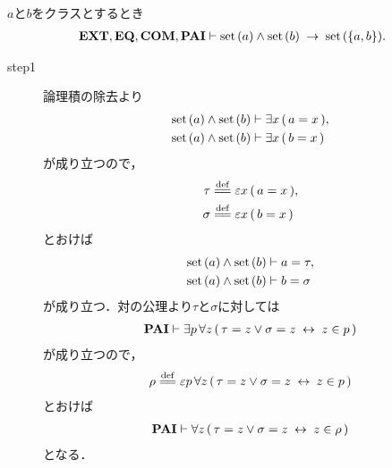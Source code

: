 	\begin{screen}
		\begin{thm}[集合の対は集合である]
		\label{thm:pair_of_sets_is_a_set}
			$a$と$b$をクラスとするとき
			\begin{align}
				\mbox{{\bf EXT}},\mbox{{\bf EQ}},\mbox{\bf COM},\mbox{{\bf PAI}} \vdash 
				\operatorname*{set}\hspace{0.15em}(a) \wedge \operatorname*{set}\hspace{0.15em}(b) \hspace{0.25em}\rightarrow\hspace{0.25em} \operatorname*{set}\hspace{0.15em}(\{a,b\}).
			\end{align}
		\end{thm}
	\end{screen}
	
	\begin{sketch}\mbox{}
		\begin{description}
			\item[step1]
				論理積の除去より
				\begin{align}
					\operatorname*{set}\hspace{0.15em}(a) \wedge \operatorname*{set}\hspace{0.15em}(b) &\vdash \exists x\, (\, a = x\, ), \\
					\operatorname*{set}\hspace{0.15em}(a) \wedge \operatorname*{set}\hspace{0.15em}(b) &\vdash \exists x\, (\, b = x\, )
				\end{align}
				が成り立つので，
				\begin{align}
					\tau &\defeq \varepsilon x\, (\, a = x\, ), \\
					\sigma &\defeq \varepsilon x\, (\, b = x\, )
				\end{align}
				とおけば
				\begin{align}
					\operatorname*{set}\hspace{0.15em}(a) \wedge \operatorname*{set}\hspace{0.15em}(b) &\vdash a = \tau, 
					\label{fom:pair_of_sets_is_a_set_1} \\
					\operatorname*{set}\hspace{0.15em}(a) \wedge \operatorname*{set}\hspace{0.15em}(b) &\vdash b = \sigma
				\end{align}
				が成り立つ．対の公理より$\tau$と$\sigma$に対しては
				\begin{align}
					\mbox{{\bf PAI}} \vdash \exists p\, \forall z\, 
						(\, \tau = z \vee \sigma = z \hspace{0.25em}\leftrightarrow\hspace{0.25em} z \in p\, )
				\end{align}
				が成り立つので，
				\begin{align}
					\rho \defeq \varepsilon p\, \forall z\, 
						(\, \tau = z \vee \sigma = z \lrarrow z \in p\, )
				\end{align}
				とおけば
				\begin{align}
					\mbox{{\bf PAI}} \vdash \forall z\, (\, \tau = z \vee \sigma = z \hspace{0.25em}\leftrightarrow\hspace{0.25em} z \in \rho\, )
					\label{fom:pair_of_sets_is_a_set_2}
				\end{align}
				となる．
				

\end{description}
\end{sketch}
